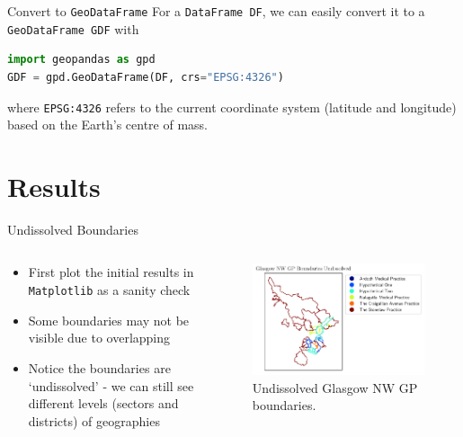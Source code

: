 \documentclass[hyperref={breaklinks,colorlinks,
   urlcolor=blue,citecolor=blue,linkcolor=red}]{beamer}
\begin{document}
\begin{frame}[fragile]{Convert to \texttt{GeoDataFrame}}
For a \texttt{DataFrame DF}, we can easily convert it to a
\texttt{GeoDataFrame GDF} with
\begin{lstlisting}[language=Python,frame=single]
import geopandas as gpd
GDF = gpd.GeoDataFrame(DF, crs="EPSG:4326")
\end{lstlisting}
where \texttt{EPSG:4326} refers to the current
coordinate system (latitude and longitude) based on the Earth's centre of mass.
\end{frame}

\section{Results}
\begin{frame}{Undissolved Boundaries}
\begin{columns}
\begin{column}{0.5\textwidth}
\begin{itemize}
\item{First plot the initial results in \texttt{Matplotlib}
as a sanity check}
\item{Some boundaries may not be visible due to overlapping}
\item{Notice the boundaries are `undissolved' - we can still see different levels (sectors and districts) of geographies}
\end{itemize}
\end{column}

\begin{column}{0.7\textwidth}
\begin{figure}
\begin{center}
\includegraphics[scale=0.5]{geography_test}
\caption{Undissolved Glasgow NW GP boundaries.}
\end{center}
\end{figure}
\end{column}
\end{columns}
\end{frame}
\end{document}
